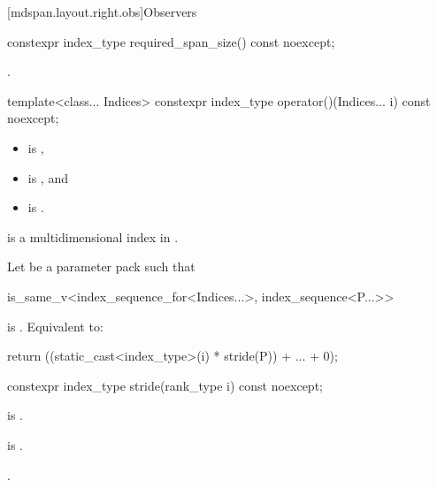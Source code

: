 [mdspan.layout.right.obs]{Observers}

%
\begin{itemdecl}
constexpr index_type required_span_size() const noexcept;
\end{itemdecl}

\begin{itemdescr}
\pnum
\returns
{}.
\end{itemdescr}

%
\begin{itemdecl}
template<class... Indices>
  constexpr index_type operator()(Indices... i) const noexcept;
\end{itemdecl}

\begin{itemdescr}
\pnum
\constraints
\begin{itemize}
\item
{} is ,
\item
{} is , and
\item
{} is
.
\end{itemize}

\pnum
\expects
{} is
a multidimensional index in .

\pnum
\effects
Let  be a parameter pack such that
\begin{codeblock}
is_same_v<index_sequence_for<Indices...>, index_sequence<P...>>
\end{codeblock}
is . Equivalent to:
\begin{codeblock}
return ((static_cast<index_type>(i) * stride(P)) + ... + 0);
\end{codeblock}
\end{itemdescr}

%
\begin{itemdecl}
constexpr index_type stride(rank_type i) const noexcept;
\end{itemdecl}

\begin{itemdescr}
\pnum
\constraints
{} is .

\pnum
\expects
{} is .

\pnum
\returns
{}.
\end{itemdescr}

